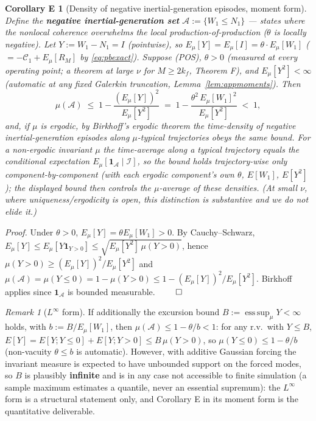 \documentclass[11pt]{article}
\theoremstyle{remark}
\newtheorem{remark}[theorem]{Remark}
\theoremstyle{plain}
\newtheorem*{thmE}{Corollary E}
\newcommand{\eqdef}{:=}
\begin{document}
\begin{thmE}[Density of negative inertial-generation episodes, moment form]
Define the \textbf{negative inertial-generation set} $\mathcal{A} \eqdef \{W_1 \le N_1\}$ --- states where the nonlocal
coherence overwhelms the local production-of-production ($\theta$ is locally negative).
Let $Y \eqdef W_1 - N_1 = I$ (pointwise), so $E_\mu[Y] = E_\mu[I] = \theta\cdot E_\mu[W_1]$
($= -\mathcal{C}_1 + E_\mu[R_M]$ by \eqref{eq:pbexact}).
Suppose (POS), $\theta > 0$ (measured at every operating point; a theorem at large $\nu$
for $M \ge 2k_f$, Theorem F), and $E_\mu[Y^2] < \infty$
(automatic at any fixed Galerkin truncation, Lemma~\ref{lem:appmoments}). Then
\begin{equation}
   \mu(\mathcal{A}) \;\le\; 1 - \frac{(E_\mu[Y])^2}{E_\mu[Y^2]}
   \;=\; 1 - \frac{\theta^2\,E_\mu[W_1]^2}{E_\mu[Y^2]} \;<\; 1,
\end{equation}
and, \emph{if $\mu$ is ergodic}, by Birkhoff's ergodic theorem the time-density of
negative inertial-generation episodes along $\mu$-typical trajectories obeys the same bound. For a
non-ergodic invariant $\mu$ the time-average along a typical trajectory equals the
conditional expectation $E_\mu[\mathbf{1}_{\mathcal{A}}\mid\mathcal{I}]$, so the bound
holds trajectory-wise only component-by-component (with each ergodic component's own
$\theta$, $E[W_1]$, $E[Y^2]$); the displayed bound then controls the $\mu$-average of these
densities. (At small $\nu$, where uniqueness/ergodicity is open, this distinction is
substantive and we do not elide it.)
\end{thmE}

\emph{Proof.} Under $\theta > 0$, $E_\mu[Y] = \theta E_\mu[W_1] > 0$. By Cauchy--Schwarz,
$E_\mu[Y] \le E_\mu[Y\mathbf{1}_{Y>0}] \le \sqrt{E_\mu[Y^2]\,\mu(Y>0)}$, hence
$\mu(Y>0) \ge (E_\mu[Y])^2/E_\mu[Y^2]$ and
$\mu(\mathcal{A}) = \mu(Y\le0) = 1 - \mu(Y>0) \le 1 - (E_\mu[Y])^2/E_\mu[Y^2]$.
Birkhoff applies since $\mathbf{1}_{\mathcal{A}}$ is bounded measurable. $\qed$

\begin{remark}[$L^\infty$ form]\label{rem:Linfty}
If additionally the excursion bound
$B \eqdef \operatorname*{ess\,sup}_\mu Y < \infty$ holds, with $b \eqdef B/E_\mu[W_1]$, then
$\mu(\mathcal{A}) \le 1 - \theta/b < 1$: for any r.v.\ with $Y \le B$,
$E[Y] = E[Y; Y\le0] + E[Y; Y>0] \le B\,\mu(Y>0)$, so
$\mu(Y\le0) \le 1 - \theta/b$ (non-vacuity $\theta \le b$ is automatic). However, with
additive Gaussian forcing the invariant measure is expected to have unbounded support on
the forced modes, so $B$ is plausibly \textbf{infinite} and is in any case not accessible
to finite simulation (a sample maximum estimates a quantile, never an essential
supremum): the $L^\infty$ form is a structural statement only, and Corollary E in its
moment form is the quantitative deliverable.
\end{remark}
\end{document}

